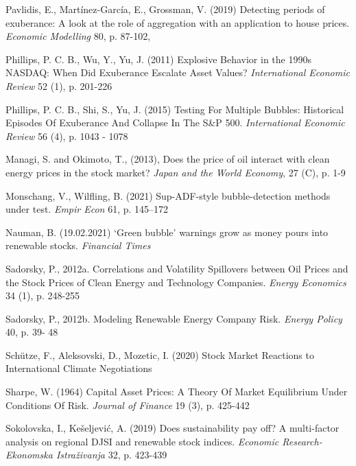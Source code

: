 \documentclass[11pt]{article}
\begin{document}
Pavlidis, E., Martínez-García, E., Grossman, V. (2019) Detecting periods of exuberance: A look at the role of aggregation with an application to house prices. \textit{Economic Modelling} 80, p. 87-102,
\newline

Phillips, P. C. B., Wu, Y., Yu, J. (2011) Explosive Behavior in the 1990s NASDAQ: When
Did Exuberance Escalate Asset Values? \textit{International Economic Review} 52 (1), p. 201-226
\newline

Phillips, P. C. B., Shi, S., Yu, J. (2015) Testing For Multiple Bubbles: Historical Episodes Of Exuberance And Collapse In The S\&P 500. \textit{International Economic Review} 56 (4), p. 1043 - 1078
\newline

Managi, S. and Okimoto, T., (2013), Does the price of oil interact with clean energy prices in the stock market? \textit{Japan and the World Economy}, 27 (C), p. 1-9
\newline

Monschang, V., Wilfling, B. (2021) Sup-ADF-style bubble-detection methods under test. \textit{Empir Econ} 61, p. 145–172
\newline

Nauman, B. (19.02.2021) ‘Green bubble’ warnings grow as money pours into renewable stocks. \textit{Financial Times}
\newline

Sadorsky, P., 2012a. Correlations and Volatility Spillovers between Oil Prices and the
Stock Prices of Clean Energy and Technology Companies. \textit{Energy Economics} 34 (1), p. 248-255
\newline

Sadorsky, P., 2012b. Modeling Renewable Energy Company Risk. \textit{Energy Policy} 40, p. 39- 48
\newline

Schütze, F., Aleksovski, D., Mozetic, I. (2020) Stock Market Reactions to International Climate Negotiations
\newline

Sharpe, W. (1964) Capital Asset Prices: A Theory Of Market Equilibrium Under Conditions Of Risk. \textit{Journal of Finance} 19 (3), p. 425-442
\newline

Sokolovska, I., Kešeljević, A. (2019) Does sustainability pay off? A multi-factor analysis on regional DJSI and renewable stock indices. \textit{Economic Research-Ekonomska Istraživanja} 32, p. 423-439
\newline
\end{document}
